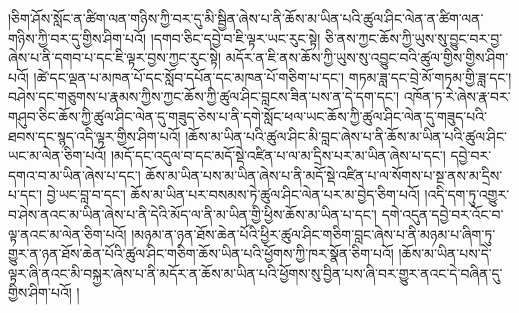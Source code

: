 །ཅིག་ཤོས་སློང་ན་ཚིག་ལན་གཉིས་ཀྱི་བར་དུ་མི་སྦྱིན་ཞེས་པ་ནི་ཆོས་མ་ཡིན་པའི་ཚུལ་ཤིང་ལེན་ན་ཚིག་ལན་གཉིས་ཀྱི་བར་དུ་གྱིས་ཤིག་པའོ། །དགབ་ཅིང་དབྱེ་བ་ཇི་ལྟར་ཡང་རུང་སྟེ། ཅི་ནས་ཀྱང་ཆོས་ཀྱི་ཡུས་སུ་བྱུང་བར་བྱ་ཞེས་པ་ནི་དགབ་པ་དང་ཇི་ལྟར་བྱས་ཀྱང་རུང་སྟེ། མདོར་ན་ཇི་ནས་ཆོས་ཀྱི་ཡུས་སུ་འབྱུང་བའི་ཚུལ་གྱིས་གྱིས་ཤིག་པའོ། །ཚེ་དང་ལྡན་པ་མཁན་པོ་དང་སློབ་དཔོན་དང་མཁན་པོ་གཅིག་པ་དང་། གཏམ་ཟླ་དང་བྲེ་མོ་གཏམ་གྱི་ཟླ་དང་། བཤེས་དང་གཅུགས་པ་རྣམས་ཀྱིས་ཀྱང་ཆོས་ཀྱི་ཚུལ་ཤིང་བླངས་ཟིན་པས་ན་དེ་དག་དང་། འཁོན་ཏ་རེ་ཞེས་རྣ་བར་གཤུབ་ཅིང་ཆོས་ཀྱི་ཚུལ་ཤིང་ལེན་དུ་གཟུད་ཅེས་པ་ནི་དགེ་སློང་ཕལ་ཡང་ཆོས་ཀྱི་ཚུལ་ཤིང་ལེན་དུ་གཟུད་པའི་ཐབས་དང་སྙད་འདི་ལྟར་གྱིས་ཤིག་པའོ། །ཆོས་མ་ཡིན་པའི་ཚུལ་ཤིང་མི་བླང་ཞེས་པ་ནི་ཆོས་མ་ཡིན་པའི་ཚུལ་ཤིང་ཡང་མ་ལེན་ཅིག་པའོ། །མདོ་དང་འདུལ་བ་དང་མདོ་སྡེ་འཛིན་པ་ལ་མ་དྲིས་པར་མ་ཡིན་ཞེས་པ་དང་། དབྱེ་བར་དགའ་བ་མ་ཡིན་ཞེས་པ་དང་། ཆོས་མ་ཡིན་པས་མ་ཡིན་ཞེས་པ་ནི་མདོ་སྡེ་འཛིན་པ་ལ་སོགས་པ་སྔ་ནས་མ་དྲིས་པ་དང་། བྱེ་ཡང་བླ་བ་དང་། ཆོས་མ་ཡིན་པར་བསམས་ཏེ་ཚུལ་ཤིང་ལེན་པར་མ་བྱེད་ཅིག་པའོ། །འདི་དག་ཏུ་འགྱུར་བ་ཤེས་ནའང་མ་ཡིན་ཞེས་པ་ནི་དེའི་མོད་ལ་ནི་མ་ཡིན་གྱི་ཕྱིས་ཆོས་མ་ཡིན་པ་དང་། དགེ་འདུན་དབྱེ་བར་འོང་བ་ལྟ་ནའང་མ་ལེན་ཅིག་པའོ། །མཉམ་ན་ཉན་ཐོས་ཆེན་པོའི་ཕྱིར་ཚུལ་ཤིང་གཅིག་བླང་ཞེས་པ་ནི་མཉམ་པ་ཞིག་ཏུ་གྱུར་ན་ཉན་ཐོས་ཆེན་པོའི་ཚུལ་ཤིང་གཅིག་ཆོས་ཡིན་པའི་ཕྱོགས་ཀྱི་ཁར་སྣོན་ཅིག་པའོ། །ཆོས་མ་ཡིན་པས་དེ་ལྟར་ཞི་ནའང་མི་བསྐྱར་ཞེས་པ་ནི་མདོར་ན་ཆོས་མ་ཡིན་པའི་ཕྱོགས་སུ་བྱིན་པས་ཞི་བར་གྱུར་ནའང་དེ་བཞིན་དུ་གྱིས་ཤིག་པའོ། །
